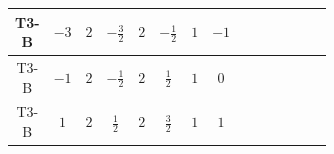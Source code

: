 \documentclass[8pt]{article}
\begin{document}
\begin{landscape}
\begin{longtable}{@{}cccccccc >{\raggedright\arraybackslash}p{0.21\linewidth} >{\raggedright\arraybackslash}p{0.21\linewidth} >{\raggedright\arraybackslash}p{0.21\linewidth}@{}}
\midrule
T3-B & $-3$ & $2$ & $-\frac{3}{2}$ & $2$ & $-\frac{1}{2}$ & $1$ & $-1$ & \scriptsize\adjustbox{max width=\linewidth}{$\begin{gathered} +D_{\mu _1}\left(S_{2,j_1}\right){}^{\dagger } D_{\mu _1}\left(S_{2,j_1}\right)\end{gathered}$} & \scriptsize\adjustbox{max width=\linewidth}{$\begin{gathered} -\overline{F_{r_1}}\, F_{r_1} M_F\end{gathered}$} & \scriptsize\adjustbox{max width=\linewidth}{$\begin{gathered} +i \overline{F_{r_1}}\, \gamma ^{\mu _1}\, D_{\mu _1}\left(F_{r_1}\right)\end{gathered}$} \\
\midrule
T3-B & $-1$ & $2$ & $-\frac{1}{2}$ & $2$ & $\frac{1}{2}$ & $1$ & $0$ & \scriptsize\adjustbox{max width=\linewidth}{$\begin{gathered} +D_{\mu _1}\left(S_{2,j_1}\right){}^{\dagger } D_{\mu _1}\left(S_{2,j_1}\right)\end{gathered}$} & \scriptsize\adjustbox{max width=\linewidth}{$\begin{gathered} -\frac{1}{2} F_{r_1}{}^T\, C\, F_{r_1} M_F\end{gathered}$} & \scriptsize\adjustbox{max width=\linewidth}{$\begin{gathered} +\frac{1}{2} i F_{r_1}{}^T\, C\, \gamma ^{\mu _1}\, D_{\mu _1}\left(F_{r_1}\right)\end{gathered}$} \\
\midrule
T3-B & $1$ & $2$ & $\frac{1}{2}$ & $2$ & $\frac{3}{2}$ & $1$ & $1$ & \scriptsize\adjustbox{max width=\linewidth}{$\begin{gathered} +D_{\mu _1}\left(S_{2,j_1}\right){}^{\dagger } D_{\mu _1}\left(S_{2,j_1}\right)\end{gathered}$} & \scriptsize\adjustbox{max width=\linewidth}{$\begin{gathered} -\overline{F_{r_1}}\, F_{r_1} M_F\end{gathered}$} & \scriptsize\adjustbox{max width=\linewidth}{$\begin{gathered} +i \overline{F_{r_1}}\, \gamma ^{\mu _1}\, D_{\mu _1}\left(F_{r_1}\right)\end{gathered}$} \\
\midrule

\end{longtable}
\end{landscape}
\end{document}
